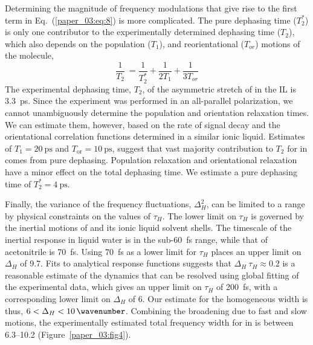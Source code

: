 \documentclass[%
  class = book,%
  crop = false,%
  float = true,%
  multi = true,%
  preview = false,%
]{standalone}
\begin{document}
Determining the magnitude of frequency modulations that give rise to the first term in Eq.~(\ref{paper_03:eq:8}) is more complicated. The pure dephasing time (\(T_{2}^{*}\)) is only one contributor to the experimentally determined dephasing time (\(T_{2}\)), which also depends on the population (\(T_{1}\)), and reorientational (\(T_{or}\)) motions of the molecule,
\begin{equation}
  \label{paper_03:eq:9}
  \frac{1}{T_{2}}\  = \frac{1}{T_{2}^{*}} + \frac{1}{2T_{1}} + \frac{1}{3T_{or}}
\end{equation}
The experimental dephasing time, \(T_{2}\), of the asymmetric stretch of  in the \ce{[C4C1im][PF6]} IL is \SI{3.3}{\pico\second}.\cite{Brinzer2015} Since the experiment was performed in an all-parallel polarization, we cannot unambiguously determine the population and orientation relaxation times. We can estimate them, however, based on the rate of signal decay and the orientational correlation functions determined in a similar ionic liquid.\cite{Giammanco2016d,Giammanco2016} Estimates of \(T_{1} = \SI{20}{\pico\second}\) and \(T_{\mathrm{or}} = \SI{10}{\pico\second}\), suggest that vast majority contribution to \(T_{2}\) for  in \ce{[C4C1im][PF6]} comes from pure dephasing. Population relaxation and orientational relaxation have a minor effect on the total dephasing time. We estimate a pure dephasing time of \(T_{2}^{*} = \SI{4}{\pico\second}\).

Finally, the variance of the frequency fluctuations, \(\Delta_{H}^{2}\), can be limited to a range by physical constraints on the values of \(\tau_{H}\). The lower limit on \(\tau_{H}\) is governed by the inertial motions of  and its ionic liquid solvent shells. The timescale of the inertial response in liquid water is in the sub-\SI{60}{\femto\second} range, while that of acetonitrile is \SI{70}{\femto\second}.\cite{feckoSci-03,stengerPRL-01,Rosenthal1991} Using \SI{70}{\femto\second} as a lower limit for \(\tau_{H}\) places an upper limit on \(\Delta_{H}\) of \SI{9.7}{\wavenumber}. Fits to analytical response functions suggests that \(\Delta_{H}\ \tau_{H} \approx 0.2\) is a reasonable estimate of the dynamics that can be resolved using global fitting of the experimental data, which gives an upper limit on \(\tau_{H}\) of \SI{200}{\femto\second}, with a corresponding lower limit on \(\Delta_{H}\) of \SI{6}{\wavenumber}. Our estimate for the homogeneous width is thus, \(6 < \Delta_{H} < \SI{10}{\wavenumber}\). Combining the broadening due to fast and slow motions, the experimentally estimated total frequency width for  in \ce{[C4C1im][PF6]} is between \SIrange{6.3}{10.2}{\wavenumber} (Figure~\ref{paper_03:fig4}).
\end{document}
